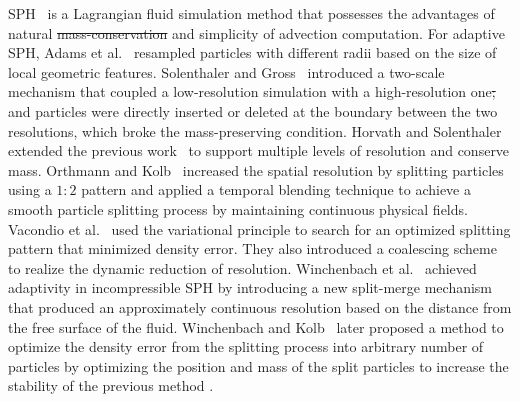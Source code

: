\documentclass[VANCOUVER,STIX1COL]{WileyNJD-v2}
\providecommand{\DIFadd}[1]{{\protect\color{blue}\uwave{#1}}} %
\providecommand{\DIFdel}[1]{{\protect\color{red}\sout{#1}}}                      %
\providecommand{\DIFaddbegin}{} %
\providecommand{\DIFaddend}{} %
\providecommand{\DIFdelbegin}{} %
\providecommand{\DIFdelend}{} %
\begin{document}
SPH~\cite{Koschier19} is a Lagrangian fluid simulation method that possesses the advantages of natural \DIFdelbegin \DIFdel{mass-conservation }\DIFdelend \DIFaddbegin \DIFadd{mass conservation }\DIFaddend and simplicity of advection computation. For adaptive SPH, Adams et al.~\cite{Adams07} resampled particles with different radii based on the size of local geometric features. Solenthaler and Gross~\cite{Solenthaler11} introduced a two-scale mechanism that coupled a low-resolution simulation with a high-resolution one\DIFdelbegin \DIFdel{; }\DIFdelend \DIFaddbegin \DIFadd{, }\DIFaddend and particles were directly inserted or deleted at the boundary between the two resolutions, which broke the mass-preserving condition. Horvath and Solenthaler~\cite{Horvath13} extended the previous work~\cite{Solenthaler11} to support multiple levels of resolution and conserve mass. Orthmann and Kolb~\cite{Orthmann12} increased the spatial resolution by splitting particles using a $1:2$ pattern and applied a temporal blending technique to achieve a smooth particle splitting process by maintaining continuous physical fields. Vacondio et al.~\cite{Vacondio16} used the variational principle to search for an optimized splitting pattern that minimized density error. They also introduced a coalescing scheme to realize the dynamic reduction of resolution. Winchenbach et al.~\cite{Winchenbach17} achieved adaptivity in incompressible SPH by introducing a new split-merge mechanism that produced an approximately continuous resolution based on the distance from the free surface of the fluid. Winchenbach and Kolb~\cite{Winchenbach21} later proposed a method to optimize the density error from the splitting process into \DIFaddbegin \DIFadd{an }\DIFaddend arbitrary number of particles by optimizing the position and mass of the split particles to increase the stability of the previous method \cite{Winchenbach17}.
\end{document}

